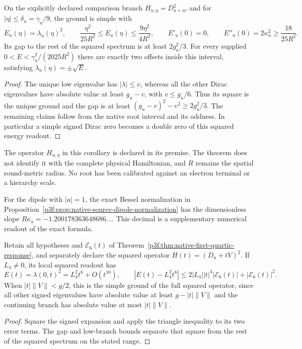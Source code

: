 \documentclass[11pt,a4paper]{article}
\begin{document}
\begin{corollary}
\label{p3f:cor:native-source-square-root}
On the explicitly declared comparison branch \(H_{u,\eta}=D_{u+\eta}^2\),
and for \(|\eta|\le\delta_u=\gamma_u/9\), the ground is simple with
\[
 E_u(\eta)=\lambda_u(\eta)^2,\qquad
 \frac{\eta^2}{25R^2}\le E_u(\eta)
      \le\frac{9\eta^2}{4R^2},\qquad
 E'_u(0)=0,\qquad
 E''_u(0)=2\kappa_u^2\ge\frac{18}{25R^2}.
\]
Its gap to the rest of the squared spectrum is at least
\(2g_u^2/3\). For every supplied \(0<E<\gamma_u^2/(2025R^2)\)
there are exactly two offsets inside this interval, satisfying
\(\lambda_u(\eta)=\pm\sqrt E\).
\end{corollary}
\begin{proof}
The unique low eigenvalue has \(|\lambda|\le v\), whereas all the
other Dirac eigenvalues have absolute value at least \(g_u-v\), with
\(v\le g_u/6\). Thus its square is the unique ground and the gap
is at least \((g_u-v)^2-v^2\ge2g_u^2/3\).
The remaining claims follow from the native root interval and its
oddness. In particular a simple signed Dirac zero becomes a double
zero of this squared energy readout.
\end{proof}

The operator \(H_{u,\eta}\) in this corollary is declared in its premise.
The theorem does not identify it with the complete physical Hamiltonian,
and \(R\) remains the spatial round-metric radius. No root has been
calibrated against an electron terminal or a hierarchy scale.

For the dipole with \(|a|=1\), the exact Bessel normalization in
Proposition~\ref{p3f:prop:native-source-dipole-normalization} has the
dimensionless slope \(R\kappa_a=-1.200178363648686\ldots\).
This decimal is a supplementary numerical readout of the exact formula.

\begin{corollary}
\label{p3f:cor:native-source-quartic-square}
Retain all hypotheses and \(\mathcal E_6(t)\) of
Theorem~\ref{p3f:thm:native-first-quartic-response}, and separately
declare the squared operator \(H(t)=(D_u+tV)^2\). If \(L_4\ne0\), its
local squared readout has
\[
 E(t)=\lambda(0,t)^2=L_4^2t^8+O(t^{10}),\qquad
 |E(t)-L_4^2t^8|\le2|L_4||t|^4|\mathcal E_6(t)|+|\mathcal E_6(t)|^2.
\]
When \(|t|\lVert V\rVert<g/2\), this is the simple ground of the full
squared operator, since all other signed eigenvalues have absolute
value at least \(g-|t|\lVert V\rVert\) and the continuing branch has
absolute value at most \(|t|\lVert V\rVert\).
\end{corollary}
\begin{proof}
Square the signed expansion and apply the triangle inequality to its two
error terms. The gap and low-branch bounds separate that square from
the rest of the squared spectrum on the stated range.
\end{proof}
\end{document}

